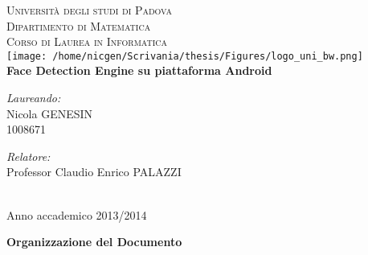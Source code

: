 \documentclass[10pt, a4paper, oneside]{Thesis} %
\begin{document}
\begin{titlepage}
\begin{center}


\vspace*{10 mm}
\textsc{\LARGE Università degli studi di Padova}\\[0.5cm] %
\textsc{\Large Dipartimento di Matematica \\
Corso di Laurea in Informatica}\\[1.0cm] %

\texttt{[image: /home/nicgen/Scrivania/thesis/Figures/logo\_uni\_bw.png]}\\[1.5cm]

{\huge \bfseries Face Detection Engine su piattaforma Android}\\[2.5cm] %
 
\begin{minipage}{0.4\textwidth}
\begin{flushleft} \large
\emph{Laureando:}\\
{Nicola GENESIN \\ 1008671} %
\end{flushleft}
\end{minipage}
\begin{minipage}{0.4\textwidth}
\begin{flushright} \large
\emph{Relatore:} \\
{Professor Claudio Enrico PALAZZI} %
\end{flushright}
\end{minipage}\\[3cm]
 
{\large Anno accademico 2013/2014}\\[4cm] %

\vfill
\end{center}

\end{titlepage}





\clearpage
\newpage
\thispagestyle{empty}
\mbox{}
\clearpage

\vspace*{7cm}

\textbf{Organizzazione del Documento}\\
\end{document}
